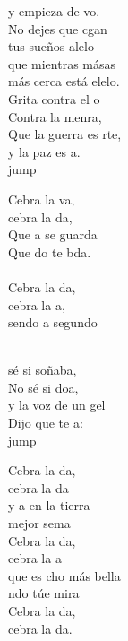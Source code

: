 \begin{cancion}
	y empieza de vo.\\
	No dejes que cgan\\
	tus sueños alelo\\
	que mientras másas\\
	más cerca está elelo.\\
	Grita contra el o\\
	Contra la menra,\\
	Que la guerra es rte,\\
	y la paz es a.\\jump\\
	\begin{chorus}%
	Cebra la va, \\
	cebra la da,\\
	Que a se guarda\\
	Que do te bda.\\
	\jump\\
	Cebra la da, \\
	cebra la a,\\
	sendo a segundo  \\
	\end{chorus}%
	\jump\\
	 sé si soñaba,\\
	No sé si doa, \\
	y la voz de un gel\\
	Dijo que te a:\\jump\\
	\begin{chorus}%
	Cebra la da, \\
	cebra la da\\
	y a en la tierra\\
	 mejor sema\\
	Cebra la da, \\
	cebra la a\\
	que es cho más bella \\
	ndo túe mira\\
	Cebra la da,\\
	cebra la da.\\
	\end{chorus}%
	\jump\\
\end{cancion}%
